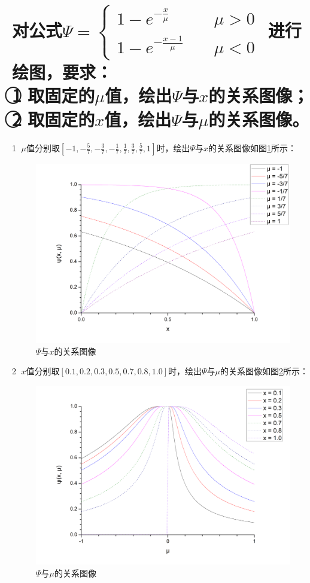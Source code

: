 \documentclass[12pt]{ctexart}
\begin{document}
\section{对公式$ \Psi = \begin{cases}
1 - e^{-\frac{x}{\mu}} & \quad \mu > 0 \\
1 - e^{-\frac{x-1}{\mu}} & \quad \mu < 0
\end{cases}$ 进行绘图，要求：\\
\textcircled{1} \quad 取固定的$\mu$值，绘出$\Psi$与$x$的关系图像；\\
\textcircled{2} \quad 取固定的$x$值，绘出$\Psi$与$\mu$的关系图像。}
\textcircled{1} $\mu$值分别取$[-1, -\frac{5}{7}, -\frac{3}{7}, -\frac{1}{7}, \frac{1}{7}, \frac{3}{7}, \frac{5}{7}, 1]$时，绘出$\Psi$与$x$的关系图像如图\ref{fig:Psi_x}所示：
\begin{figure}[H]
    \centering
    \includegraphics[width=\textwidth]{img/psi_x1.png}
    \caption{$\Psi$与$x$的关系图像}
    \label{fig:Psi_x}
\end{figure}
\textcircled{2} $x$值分别取$[0.1, 0.2, 0.3, 0.5, 0.7, 0.8, 1.0]$时，绘出$\Psi$与$\mu$的关系图像如图\ref{fig:Psi_mu}所示：
\begin{figure}[H]
    \centering
    \includegraphics[width=\textwidth]{img/psi_mu1.png}
    \caption{$\Psi$与$\mu$的关系图像}
    \label{fig:Psi_mu}
\end{figure}
\end{document}
